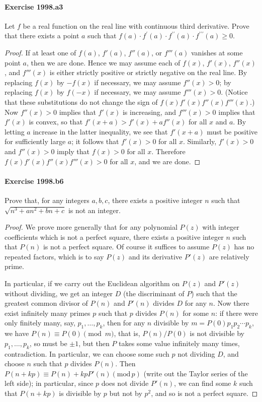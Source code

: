 \documentclass{article}
\begin{document}
\paragraph{Exercise 1998.a3} Let $f$ be a real function on the real line with continuous third derivative. Prove that there exists a point $a$ such that
$f(a) \cdot f^{\prime}(a) \cdot f^{\prime \prime}(a) \cdot f^{\prime \prime \prime}(a) \geq 0$. 
\begin{proof}
    If at least one of $f(a)$, $f'(a)$, $f''(a)$, or $f'''(a)$ vanishes
at some point $a$, then we are done.  Hence we may assume each of
$f(x)$, $f'(x)$, $f''(x)$, and $f'''(x)$ is either strictly positive
or strictly negative on the real line.  By replacing $f(x)$ by $-f(x)$
if necessary, we may assume $f''(x)>0$; by replacing $f(x)$
by $f(-x)$ if necessary, we may assume $f'''(x)>0$.  (Notice that these
substitutions do not change the sign of $f(x) f'(x) f''(x) f'''(x)$.)
Now $f''(x)>0$ implies that $f'(x)$ is increasing, and $f'''(x)>0$
implies that $f'(x)$ is convex, so that $f'(x+a)>f'(x)+a f''(x)$
for all $x$ and $a$.  By
letting $a$ increase in the latter inequality, we see that $f'(x+a)$
must be positive for sufficiently large $a$; it follows that
$f'(x)>0$
for all $x$.  Similarly, $f'(x)>0$ and $f''(x)>0$ imply
that $f(x)>0$ for all $x$.  Therefore $f(x) f'(x) f''(x) f'''(x)>0$ for
all $x$, and we are done.
\end{proof}



\paragraph{Exercise 1998.b6} Prove that, for any integers $a, b, c$, there exists a positive integer $n$ such that $\sqrt{n^3+a n^2+b n+c}$ is not an integer.
\begin{proof}
    We prove more generally that for any polynomial $P(z)$ with integer
coefficients which is not a perfect square, there exists a positive
integer $n$ such that $P(n)$ is not a perfect square. Of course it
suffices to assume $P(z)$ has no repeated factors, which is to say $P(z)$
and its derivative $P'(z)$ are relatively prime.

In particular, if we carry out the Euclidean algorithm on $P(z)$ and $P'(z)$
without dividing, we get an integer $D$ (the discriminant of $P$) such that
the greatest common divisor of $P(n)$ and $P'(n)$ divides $D$ for any $n$.
Now there exist infinitely many primes $p$ such that $p$ divides $P(n)$ for
some $n$: if there were only finitely many, say, $p_1, \dots, p_k$, then
for any $n$ divisible by $m = P(0) p_1 p_2 \cdots p_k$, we have $P(n)
\equiv P(0) \pmod{m}$, that is, $P(n)/P(0)$ is not divisible by $p_1,
\dots, p_k$, so must be $\pm 1$, but then $P$ takes some value infinitely
many times, contradiction. In particular, we can choose some such $p$ not
dividing $D$, and choose $n$ such that $p$ divides $P(n)$. Then $P(n+kp)
\equiv P(n) + kp P'(n) (\mathrm{mod}\,p)$
(write out the Taylor series of the left side);
in particular, since $p$ does not divide $P'(n)$, we can find some $k$
such that $P(n+kp)$ is divisible by $p$ but not by $p^2$, and so
is not a perfect square.
\end{proof}
\end{document}
